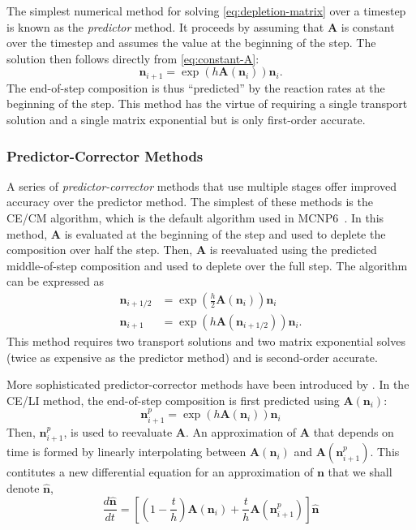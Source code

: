 \documentclass[3p,authoryear]{elsarticle}
\begin{document}
The simplest numerical method for solving \cref{eq:depletion-matrix} over a
timestep is known as the \emph{predictor} method. It proceeds by assuming that
$\mathbf{A}$ is constant over the timestep and assumes the value at the
beginning of the step. The solution then follows directly from
\cref{eq:constant-A}:
\begin{equation}
    \mathbf{n}_{i+1} = \exp\left(h\mathbf{A}(\mathbf{n}_i) \right) \mathbf{n}_i.
\end{equation}
The end-of-step composition is thus ``predicted'' by the reaction rates at the
beginning of the step. This method has the virtue of requiring a single
transport solution and a single matrix exponential but is only first-order
accurate.

\subsubsection{Predictor-Corrector Methods}

A series of \emph{predictor-corrector} methods that use multiple stages offer
improved accuracy over the predictor method. The simplest of these methods is
the CE/CM algorithm, which is the default algorithm used in
MCNP6~\citep{fensin2006tans}. In this method, $\mathbf{A}$ is evaluated at the
beginning of the step and used to deplete the composition over half the step.
Then, $\mathbf{A}$ is reevaluated using the predicted middle-of-step composition
and used to deplete over the full step. The algorithm can be expressed as
\begin{align}
    \mathbf{n}_{i+1/2} &= \exp \left (\frac{h}{2}\mathbf{A}(\mathbf{n}_i) \right) \mathbf{n}_i \\
    \mathbf{n}_{i+1} &= \exp \left(h \mathbf{A}(\mathbf{n}_{i+1/2}) \right) \mathbf{n}_i.
\end{align}
This method requires two transport solutions and two matrix exponential solves
(twice as expensive as the predictor method) and is second-order accurate.

More sophisticated predictor-corrector methods have been introduced by
\citet{isotalo2011ane2,isotalo2011ane3}. In the CE/LI method, the end-of-step
composition is first predicted using $\mathbf{A}(\mathbf{n}_i)$:
\begin{equation}
  \mathbf{n}_{i+1}^p = \exp \left( h\mathbf{A}(\mathbf{n}_i) \right) \mathbf{n}_i
\end{equation}
Then, $\mathbf{n}_{i+1}^p$, is used to reevaluate $\mathbf{A}$. An approximation
of $\mathbf{A}$ that depends on time is formed by linearly interpolating between
$\mathbf{A}(\mathbf{n}_i)$ and $\mathbf{A}\left(\mathbf{n}_{i+1}^p\right)$. This
contitutes a new differential equation for an approximation of $\mathbf{n}$ that
we shall denote $\hat{\mathbf{n}}$,
\begin{equation}
  \frac{d\hat{\mathbf{n}}}{dt} = \left [ \left ( 1 - \frac{t}{h} \right)
  \mathbf{A}(\mathbf{n}_i) + \frac{t}{h} \mathbf{A}\left(\mathbf{n}_{i+1}^p \right) \right ] \hat{\mathbf{n}}
\end{equation}
\end{document}
